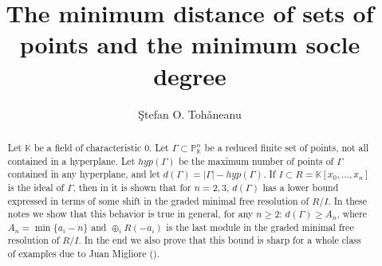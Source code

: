 \documentclass[12pt]{amsart}
\begin{document}
\sloppy
\newtheorem{defn0}{Definition}[section]
\newtheorem{prop0}[defn0]{Proposition}
\newtheorem{conj0}[defn0]{Conjecture}
\newtheorem{thm0}[defn0]{Theorem}
\newtheorem{lem0}[defn0]{Lemma}
\newtheorem{corollary0}[defn0]{Corollary}
\newtheorem{example0}[defn0]{Example}

\newenvironment{defn}{\begin{defn0}}{\end{defn0}}
\newenvironment{prop}{\begin{prop0}}{\end{prop0}}
\newenvironment{conj}{\begin{conj0}}{\end{conj0}}
\newenvironment{thm}{\begin{thm0}}{\end{thm0}}
\newenvironment{lem}{\begin{lem0}}{\end{lem0}}
\newenvironment{cor}{\begin{corollary0}}{\end{corollary0}}
\newenvironment{exm}{\begin{example0}\rm}{\end{example0}}

\title {The minimum distance of sets of points and the minimum socle degree}

\author{\c Stefan O. Toh\v aneanu}
\address{Department of Mathematics\\ The University of Western Ontario\\ London, Ontario N6A 5B7\\}

 

\begin{abstract}
\noindent Let $\mathbb K$ be a field of characteristic 0. Let $\Gamma\subset\mathbb P^n_{\mathbb K}$ be a reduced finite set of points, not all contained in a hyperplane. Let $hyp(\Gamma)$ be the maximum number of points of $\Gamma$ contained in any hyperplane, and let $d(\Gamma)=|\Gamma|-hyp(\Gamma)$. If $I\subset R=\mathbb K[x_0,\ldots,x_n]$ is the ideal of $\Gamma$, then in \cite{t1} it is shown that for $n=2,3$, $d(\Gamma)$ has a lower bound expressed in terms of some shift in the graded minimal free resolution of $R/I$. In these notes we show that this behavior is true in general, for any $n\geq 2$: $d(\Gamma)\geq A_n$, where $A_n=\min\{a_i-n\}$ and $\oplus_i R(-a_i)$ is the last module in the graded minimal free resolution of $R/I$. In the end we also prove that this bound is sharp for a whole class of examples due to Juan Migliore (\cite{m}).
\end{abstract}
\maketitle
\end{document}
